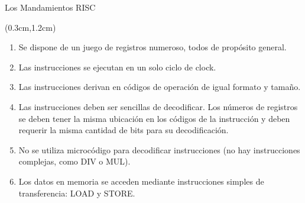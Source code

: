 \documentclass[table,dvipsnames,aspectratio=169]{beamer}
\begin{document}

\begin{frame}{Los Mandamientos RISC}
 \begin{textblock*}{\textwidth}(0.3cm,1.2cm)
  \begin{enumerate}[<+(1)->]\justifying \parskip 0.2cm
   \item Se dispone de un \textcolor{furfiBlue}{juego de registros numeroso}, todos de propósito general.
   \item Las instrucciones \textcolor{furfiBlue}{se ejecutan en un solo ciclo} de clock.
   \item Las instrucciones derivan en \textcolor{furfiBlue}{códigos de operación de igual formato y tamaño}.
   \item Las instrucciones deben ser \textcolor{furfiBlue}{sencillas de decodificar}.
   {\small Los números de registros se deben tener la misma ubicación en los códigos de la instrucción y deben requerir la misma cantidad de bits para su decodificación.}
   \item \textcolor{furfiBlue}{No se utiliza microcódigo} para decodificar instrucciones {\small (no hay instrucciones complejas, como DIV o MUL).}
   \item Los datos en memoria se acceden mediante \textcolor{furfiBlue}{instrucciones simples de transferencia}: LOAD y STORE.
  \end{enumerate}
 \end{textblock*}
\end{frame}
\end{document}
